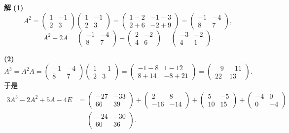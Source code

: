 \documentclass[11pt,a4paper]{ctexart}
\newenvironment{solution}
  {\par\noindent\textbf{解}\quad}
  {\par}
\begin{document}
\begin{solution}
\textbf{(1)}
\[
A^2=\begin{pmatrix}1&-1\\2&3\end{pmatrix}\begin{pmatrix}1&-1\\2&3\end{pmatrix}
=\begin{pmatrix}1-2&-1-3\\2+6&-2+9\end{pmatrix}
=\begin{pmatrix}-1&-4\\8&7\end{pmatrix},
\]
\[
A^2-2A=\begin{pmatrix}-1&-4\\8&7\end{pmatrix}-\begin{pmatrix}2&-2\\4&6\end{pmatrix}
=\begin{pmatrix}-3&-2\\4&1\end{pmatrix}.
\]

\textbf{(2)}
\[
A^3=A^2A=\begin{pmatrix}-1&-4\\8&7\end{pmatrix}\begin{pmatrix}1&-1\\2&3\end{pmatrix}
=\begin{pmatrix}-1-8&1-12\\8+14&-8+21\end{pmatrix}
=\begin{pmatrix}-9&-11\\22&13\end{pmatrix}.
\]
于是
\[
\begin{aligned}
3A^3-2A^2+5A-4E
&=\begin{pmatrix}-27&-33\\66&39\end{pmatrix}
+\begin{pmatrix}2&8\\-16&-14\end{pmatrix}
+\begin{pmatrix}5&-5\\10&15\end{pmatrix}
+\begin{pmatrix}-4&0\\0&-4\end{pmatrix}\\
&=\begin{pmatrix}-24&-30\\60&36\end{pmatrix}.
\end{aligned}
\]
\end{solution}
\end{document}

